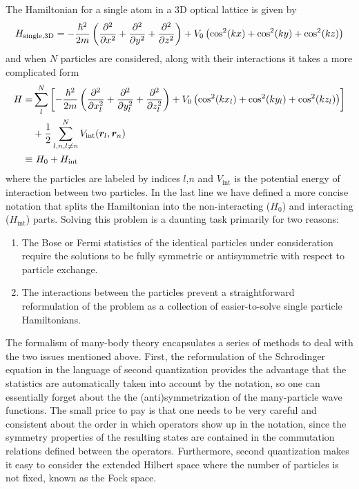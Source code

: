 The Hamiltonian for a single atom in a 3D optical lattice is given by  
\begin{equation}
  H_{\text{single,3D}} = - \frac{\hbar^{2}}{2m} 
                 \left( \frac{\partial^{2}}{\partial x^{2}}
                            + \frac{\partial^{2}}{\partial y^{2}}
                            + \frac{\partial^{2}}{\partial z^{2}} \right)
 + V_{0}\left( \cos^{2}(kx)  + \cos^{2}(ky) + \cos^{2}(kz) \right)
\end{equation}
and when $N$ particles are considered, along with their interactions it takes a
more complicated form 
\begin{equation}
\begin{split}
  H = & \sum_{l}^{N}\left[ 
  -\frac{\hbar^{2}}{2m} \left( \frac{\partial^{2}}{\partial x_{l}^{2}}
                            + \frac{\partial^{2}}{\partial y_{l}^{2}}
                            + \frac{\partial^{2}}{\partial z_{l}^{2}} \right)
 + V_{0}\left( 
        \cos^{2}(kx_{l})  + \cos^{2}(ky_{l}) + \cos^{2}(kz_{l}) 
      \right) \right]\\
      &  + \frac{1}{2}\sum_{ l,n, l\neq n}^{N} 
              V_{\mathrm{int}}(\bm{r}_{l},\bm{r}_{n} )\\ 
    \equiv & ~ H_{0} + H_{\text{int}}
 \label{eq:hubbard1st}
\end{split} 
\end{equation} 
where the particles are labeled by indices $l$,$n$ and $V_{\mathrm{int}}$ is
the potential energy of interaction between two particles.  In the last line we
have defined a more concise notation that splits the Hamiltonian into the
non-interacting ($H_{0}$) and interacting ($H_{\text{int}}$) parts. Solving
this problem is a daunting task primarily for two reasons:
\begin{enumerate}
    \item The Bose or Fermi statistics of the identical particles under
consideration require the solutions to be fully symmetric or antisymmetric with
respect to particle exchange.
 
    \item The interactions between the particles prevent a straightforward
reformulation of the problem as a collection of easier-to-solve single particle
Hamiltonians.  
\end{enumerate}

The formalism of many-body theory encapsulates a series of methods to deal with
the two issues mentioned above.   First, the reformulation of the Schrodinger
equation in the language of second quantization provides the advantage that the
statistics are automatically taken into account by the notation, so one can
essentially forget about the the (anti)symmetrization of the many-particle wave
functions.  The small price to pay is that one needs to be very careful and
consistent about the order in which operators show up in the notation, since
the symmetry properties of the resulting states are contained in the
commutation relations defined between the operators.  Furthermore, second
quantization makes it easy to consider the extended Hilbert space where the
number of particles is not fixed, known as the Fock space. 

